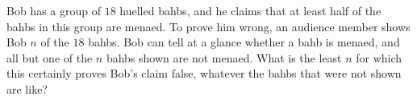 Bob has a group of $18$ huelled bahbs, and he claims that at least half of the bahbs in this group are menaed. To prove him wrong, an audience member shows Bob $n$ of the $18$ bahbs. Bob can tell at a glance whether a bahb is menaed, and all but one of the $n$ bahbs shown are not menaed. What is the least $n$ for which this certainly proves Bob's claim false, whatever the bahbs that were not shown are like?
